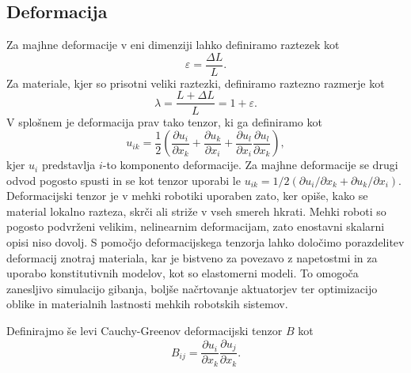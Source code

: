 \documentclass[12pt ]{article}
\begin{document}
\subsection{Deformacija}
Za majhne deformacije v eni dimenziji lahko definiramo raztezek kot $$\varepsilon=\frac{\Delta L}{L}.$$ Za materiale, kjer so prisotni veliki raztezki, definiramo raztezno razmerje kot $$\lambda=\frac{L+\Delta L}{L}=1+\varepsilon.$$ V splošnem je deformacija prav tako tenzor, ki ga definiramo kot $$u_{ik}=\frac{1}{2}\left(\frac{\partial u_i}{\partial x_k}+\frac{\partial u_k}{\partial x_i} + \frac{\partial u_l}{\partial x_i}\frac{\partial u_l}{\partial x_k} \right),$$ kjer $u_i$ predstavlja $i$-to komponento deformacije. Za majhne deformacije se drugi odvod pogosto spusti in se kot tenzor uporabi le $u_{ik}=1/2(\partial u_i/\partial x_k+\partial u_k/\partial x_i).$ Deformacijski tenzor je v mehki robotiki uporaben zato, ker opiše, kako se material lokalno razteza, skrči ali striže v vseh smereh hkrati. Mehki roboti so pogosto podvrženi velikim, nelinearnim deformacijam, zato enostavni skalarni opisi niso dovolj. S pomočjo deformacijskega tenzorja lahko določimo porazdelitev deformacij znotraj materiala, kar je bistveno za povezavo z napetostmi in za uporabo konstitutivnih modelov, kot so elastomerni modeli. To omogoča zanesljivo simulacijo gibanja, boljše načrtovanje aktuatorjev ter optimizacijo oblike in materialnih lastnosti mehkih robotskih sistemov.

Definirajmo še levi Cauchy-Greenov deformacijski tenzor $B$ kot $$B_{ij}=\frac{\partial u_i}{\partial x_k}\frac{\partial u_j}{\partial x_k}.$$
\end{document}
